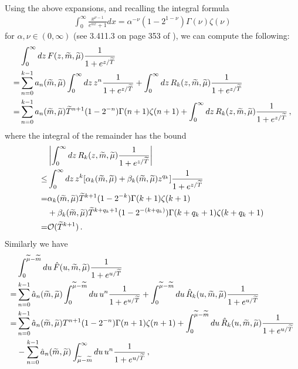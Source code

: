 \documentclass[sn-mathphys,Numbered]{sn-jnl}
\newcommand{\wt}[1]{\widetilde{#1}}
\begin{document}
Using the above expansions, and recalling the integral formula
\begin{align}
    \int_0^\infty \frac{x^{\nu-1}}{e^{\alpha x}+1}dx=\alpha^{-\nu}(1-2^{1-\nu})\Gamma(\nu)\zeta(\nu)
\end{align}
for $\alpha,\nu\in(0,\infty)$ (see 3.411.3 on page 353 of  \cite{integral_table_book}),  we can compute the following:
\begin{align}
 &\int_0^\infty dz\, F(z,\wt{m},\wt{\mu})\frac{1}{1+e^{z/\wt{T}}}\\
 =& \sum_{n=0}^{k-1} a_{n}(\wt{m},\wt{\mu})\int_0^\infty dz\, z^n \frac{1}{1+e^{z/\wt{T}}}+ \int_0^\infty dz\, R_k(z,\wt{m},\wt{\mu})\frac{1}{1+e^{z/\wt{T}}}\notag\\
 =& \sum_{n=0}^{k-1} a_{n}(\wt{m},\wt{\mu})\wt{T}^{n+1}(1-2^{-n})\Gamma(n+1)\zeta(n+1)+ \int_0^\infty dz\, R_k(z,\wt{m},\wt{\mu})\frac{1}{1+e^{z/\wt{T}}}\,,\notag
\end{align}
where the integral of the remainder has the bound
\begin{align}
  &\left|\int_0^\infty dz\, R_k(z,\wt{m},\wt{\mu})\frac{1}{1+e^{z/\wt{T}}}\right|\\
  \leq &   \int_0^\infty dz\,z^k[\alpha_k(\wt{m},\wt{\mu})+\beta_k(\wt{m},\wt{\mu}) z^{q_k}]\frac{1}{1+e^{z/\wt{T}}}\notag\\
  =& \alpha_k(\wt{m},\wt{\mu}) \wt{T}^{k+1}(1-2^{-k})\Gamma(k+1)\zeta(k+1)\notag\\
  &+\beta_k(\wt{m},\wt{\mu}) \wt{T}^{k+q_k+1}(1-2^{-(k+q_k)})\Gamma(k+q_k+1)\zeta(k+q_k+1)\notag\\ 
  =&\mathcal{O}(\wt{T}^{k+1})\,.\notag
\end{align}
Similarly we have
\begin{align}
    &\int_0^{\wt{\mu}-\wt{m}} du\,\hat{F}(u,\wt{m},\wt{\mu})\frac{1}{1+e^{u/\wt{T}}}\\
    =&\sum_{n=0}^{k-1} \hat{a}_{n}(\wt{m},\wt{\mu})\int_0^{\wt{\mu}-\wt{m}} du \,u^n  \frac{1}{1+e^{u/\wt{T}}}+ \int_0^{\wt{\mu}-\wt{m}} du\,\hat{R}_k(u,\wt{m},\wt{\mu}) \frac{1}{1+e^{u/\wt{T}}}    \notag\\
        =&\sum_{n=0}^{k-1} \hat{a}_{n}(\wt{m},\wt{\mu})
        T^{n+1}(1-2^{-n})\Gamma(n+1)\zeta(n+1)      
        + \int_0^{\wt{\mu}-\wt{m}} du\,\hat{R}_k(u,\wt{m},\wt{\mu}) \frac{1}{1+e^{u/\wt{T}}}    \notag\\
        &-\sum_{n=0}^{k-1} \hat{a}_{n}(\wt{m},\wt{\mu})\int_{\wt{\mu}-\wt{m}}^\infty du\, u^n  \frac{1}{1+e^{u/\wt{T}}}\,,\notag
\end{align}
\end{document}
